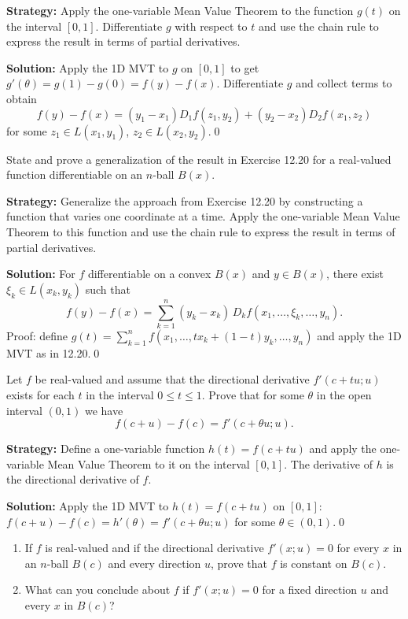 \noindent\textbf{Strategy:} Apply the one-variable Mean Value Theorem to the function \( g(t) \) on the interval \( [0,1] \). Differentiate \( g \) with respect to \( t \) and use the chain rule to express the result in terms of partial derivatives.

\bigskip\noindent\textbf{Solution:}
Apply the 1D MVT to $g$ on $[0,1]$ to get $g'(\theta)=g(1)-g(0)=f(y)-f(x)$. Differentiate $g$ and collect terms to obtain
\[f(y)-f(x)=(y_1-x_1)D_1 f(z_1,y_2)+(y_2-x_2)D_2 f(x_1,z_2)\]
for some $z_1\in L(x_1,y_1)$, $z_2\in L(x_2,y_2)$.\qed


\begin{problembox}
State and prove a generalization of the result in Exercise 12.20 for a real-valued function differentiable on an \( n \)-ball \( B(x) \).
\end{problembox}

\noindent\textbf{Strategy:} Generalize the approach from Exercise 12.20 by constructing a function that varies one coordinate at a time. Apply the one-variable Mean Value Theorem to this function and use the chain rule to express the result in terms of partial derivatives.

\bigskip\noindent\textbf{Solution:}
For $f$ differentiable on a convex $B(x)$ and $y\in B(x)$, there exist $\xi_k\in L(x_k,y_k)$ such that
\[f(y)-f(x)=\sum_{k=1}^n (y_k-x_k)\,D_k f(x_1,\dots,\xi_k,\dots,y_n).\]
Proof: define $g(t)=\sum_{k=1}^n f(x_1,\dots,tx_k+(1-t)y_k,\dots,y_n)$ and apply the 1D MVT as in 12.20.\qed


\begin{problembox}
Let \( f \) be real-valued and assume that the directional derivative \( f'(c + tu; u) \) exists for each \( t \) in the interval \( 0 \leq t \leq 1 \). Prove that for some \( \theta \) in the open interval \( (0, 1) \) we have
\[f(c + u) - f(c) = f'(c + \theta u; u).\]
\end{problembox}

\noindent\textbf{Strategy:} Define a one-variable function \( h(t) = f(c + tu) \) and apply the one-variable Mean Value Theorem to it on the interval \( [0,1] \). The derivative of \( h \) is the directional derivative of \( f \).

\bigskip\noindent\textbf{Solution:}
Apply the 1D MVT to $h(t)=f(c+tu)$ on $[0,1]$: $f(c+u)-f(c)=h'(\theta)=f'(c+\theta u;u)$ for some $\theta\in(0,1)$.\qed


\begin{problembox}
\begin{enumerate}[label=(\alph*)]
\item If \( f \) is real-valued and if the directional derivative \( f'(x; u) = 0 \) for every \( x \) in an \( n \)-ball \( B(c) \) and every direction \( u \), prove that \( f \) is constant on \( B(c) \).
\item What can you conclude about \( f \) if \( f'(x; u) = 0 \) for a fixed direction \( u \) and every \( x \) in \( B(c) \)?
\end{enumerate}
\end{problembox}

